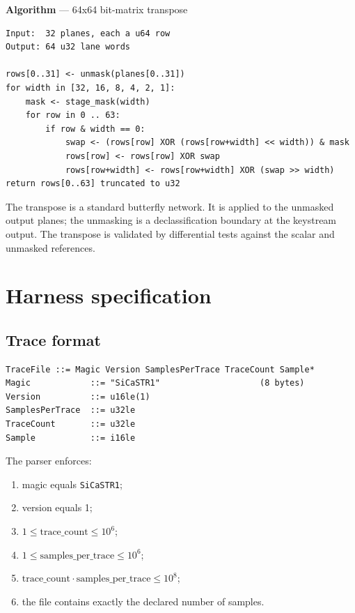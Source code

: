 \documentclass[11pt,a4paper]{article}
\newcommand{\code}[1]{\texttt{#1}}
\theoremstyle{plain}
\theoremstyle{definition}
\theoremstyle{remark}
\newcounter{algblock}
\newenvironment{algorithmblock}[1]{%
  \par\medskip\refstepcounter{algblock}%
  \noindent\textbf{Algorithm \thealgblock} --- #1\par\nopagebreak
  \noindent\begin{minipage}{\linewidth}\small
}{%
  \end{minipage}\par\medskip
}
\begin{document}
\begin{algorithmblock}{64x64 bit-matrix transpose}
\begin{verbatim}
Input:  32 planes, each a u64 row
Output: 64 u32 lane words

rows[0..31] <- unmask(planes[0..31])
for width in [32, 16, 8, 4, 2, 1]:
    mask <- stage_mask(width)
    for row in 0 .. 63:
        if row & width == 0:
            swap <- (rows[row] XOR (rows[row+width] << width)) & mask
            rows[row] <- rows[row] XOR swap
            rows[row+width] <- rows[row+width] XOR (swap >> width)
return rows[0..63] truncated to u32
\end{verbatim}
\end{algorithmblock}

The transpose is a standard butterfly network. It is applied to the unmasked output
planes; the unmasking is a declassification boundary at the keystream output. The
transpose is validated by differential tests against the scalar and unmasked
references.

\section{Harness specification}\label{sec:harness}

\subsection{Trace format}

\begin{verbatim}
TraceFile ::= Magic Version SamplesPerTrace TraceCount Sample*
Magic            ::= "SiCaSTR1"                    (8 bytes)
Version          ::= u16le(1)
SamplesPerTrace  ::= u32le
TraceCount       ::= u32le
Sample           ::= i16le
\end{verbatim}

The parser enforces:
\begin{enumerate}[leftmargin=1.5em]
  \item magic equals \code{SiCaSTR1};
  \item version equals 1;
  \item \(1\le \text{trace\_count}\le 10^6\);
  \item \(1\le \text{samples\_per\_trace}\le 10^6\);
  \item \(\text{trace\_count}\cdot\text{samples\_per\_trace}\le 10^8\);
  \item the file contains exactly the declared number of samples.
\end{enumerate}
\end{document}
